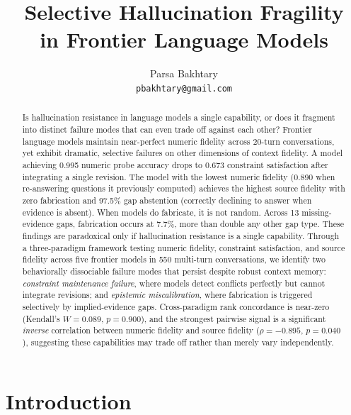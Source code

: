 \documentclass[11pt,a4paper]{article}
\title{Selective Hallucination Fragility\\ in Frontier Language Models}
\author{Parsa Bakhtary \\
  \texttt{pbakhtary@gmail.com}}
\begin{document}
\maketitle

\begin{abstract}
Is hallucination resistance in language models a single capability, or does it fragment into distinct failure modes that can even trade off against each other?
Frontier language models maintain near-perfect numeric fidelity across 20-turn conversations, yet exhibit dramatic, selective failures on other dimensions of context fidelity.
A model achieving 0.995 numeric probe accuracy drops to 0.673 constraint satisfaction after integrating a single revision.
The model with the lowest numeric fidelity (0.890 when re-answering questions it previously computed) achieves the highest source fidelity with zero fabrication and 97.5\% gap abstention (correctly declining to answer when evidence is absent).
When models do fabricate, it is not random. Across 13 missing-evidence gaps, fabrication occurs at 7.7\%, more than double any other gap type.
These findings are paradoxical only if hallucination resistance is a single capability.
Through a three-paradigm framework testing numeric fidelity, constraint satisfaction, and source fidelity across five frontier models in 550 multi-turn conversations, we identify two behaviorally dissociable failure modes that persist despite robust context memory: \emph{constraint maintenance failure}, where models detect conflicts perfectly but cannot integrate revisions; and \emph{epistemic miscalibration}, where fabrication is triggered selectively by implied-evidence gaps.
Cross-paradigm rank concordance is near-zero (Kendall's $W = 0.089$, $p = 0.900$), and the strongest pairwise signal is a significant \emph{inverse} correlation between numeric fidelity and source fidelity ($\rho = -0.895$, $p = 0.040$), suggesting these capabilities may trade off rather than merely vary independently.
\end{abstract}

\section{Introduction}
\label{sec:intro}
\end{document}

